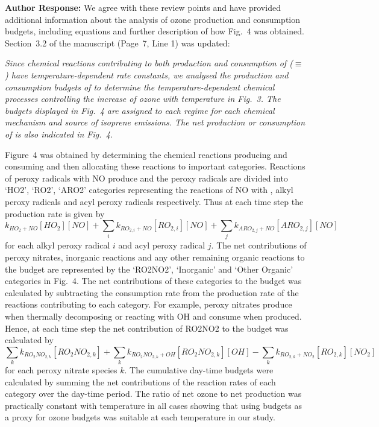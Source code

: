 \documentclass{article}
\begin{document}
\textbf{Author Response:} We agree with these review points and have provided additional information about the analysis of ozone production and consumption budgets, including equations and further description of how Fig.~4 was obtained. Section~3.2 of the manuscript (Page~7, Line 1) was updated:
{\itshape
Since chemical reactions contributing to both production and consumption of  ($\equiv$ ) have temperature-dependent rate constants, we analysed the production and consumption budgets of  to determine the temperature-dependent chemical processes controlling the increase of ozone with temperature in Fig.~3.
The  budgets displayed in Fig.~4 are assigned to each  regime for each chemical mechanism and source of isoprene emissions.
The net production or consumption of  is also indicated in Fig.~4.

Figure~4 was obtained by determining the chemical reactions producing and consuming  and then allocating these reactions to important categories.
Reactions of peroxy radicals with NO produce  and the peroxy radicals are divided into `HO2', `RO2', `ARO2' categories representing the reactions of NO with , alkyl peroxy radicals and acyl peroxy radicals respectively.
Thus at each time step the  production rate is given by 
\begin{equation}
    k_{HO_2 + NO}[HO_2][NO] + \sum_i{k_{RO_{2,i} + NO}[RO_{2,i}][NO]} + \sum_j{k_{ARO_{2,j} + NO}[ARO_{2,j}][NO]}
\end{equation}
for each alkyl peroxy radical $i$ and acyl peroxy radical $j$.
The net contributions of peroxy nitrates, inorganic reactions and any other remaining organic reactions to the  budget are represented by the `RO2NO2', `Inorganic' and `Other Organic' categories in Fig.~4.
The net contributions of these categories to the  budget was calculated by subtracting the consumption rate from the production rate of the reactions contributing to each category.
For example, peroxy nitrates produce  when thermally decomposing or reacting with OH and consume  when produced.
Hence, at each time step the net contribution of RO2NO2 to the  budget was calculated by
\begin{equation}
    \sum_k{k_{RO_2NO_{2,k}}[RO_2NO_{2,k}]} + \sum_k{k_{RO_2NO_{2,k} + OH}[RO_2NO_{2,k}][OH]} - \sum_k{k_{RO_{2,k} + NO_2}[RO_{2,k}][NO_2]}
\end{equation}
for each peroxy nitrate species $k$.
The cumulative day-time budgets were calculated by summing the net contributions of the reaction rates of each category over the day-time period.
The ratio of net ozone to net  production was practically constant with temperature in all cases showing that using  budgets as a proxy for ozone budgets was suitable at each temperature in our study.
}
\end{document}
